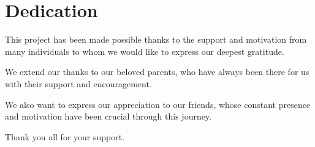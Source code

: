 %
\section*{Dedication}
\label{sec::dedication}

   This project has been made possible thanks to the support and motivation from many individuals to whom we would like to express our deepest gratitude.

   We extend our thanks to our beloved parents, who have always been there for us with their support and encouragement.

   We also want to express our appreciation to our friends, whose constant presence and motivation have been crucial through this journey.

   Thank you all for your support.



\vspace*{\fill}
